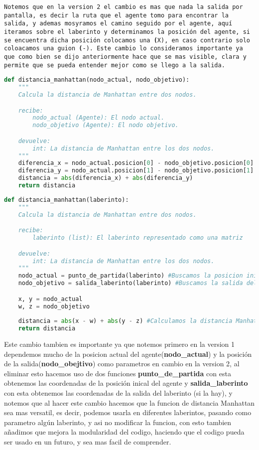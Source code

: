 {\tt Notemos que en la version 2 el cambio es mas que nada la salida por pantalla, es decir la ruta que el agente tomo para encontrar la salida, y ademas mosyramos el camino seguido por el agente, aquí iteramos sobre el laberinto y determinamos la posición del agente, si se encuentra dicha posición colocamos una \textbf(X), en caso contrario solo coloacamos una guion \textbf(-). Este cambio lo consideramos importante ya que como bien se dijo anteriormente hace que se mas visible, clara y permite que se pueda entender mejor como se llego a la salida.}

\begin{lstlisting}[language=Python, caption=Version 1: distancia_manhattan]
    def distancia_manhattan(nodo_actual, nodo_objetivo):
    """
    Calcula la distancia de Manhattan entre dos nodos.

    recibe:
        nodo_actual (Agente): El nodo actual.
        nodo_objetivo (Agente): El nodo objetivo.

    devuelve:
        int: La distancia de Manhattan entre los dos nodos.
    """
    diferencia_x = nodo_actual.posicion[0] - nodo_objetivo.posicion[0]
    diferencia_y = nodo_actual.posicion[1] - nodo_objetivo.posicion[1]
    distancia = abs(diferencia_x) + abs(diferencia_y)
    return distancia
\end{lstlisting}

\begin{lstlisting}[language=Python, caption=Version 2: distancia_manhattan]
    def distancia_manhattan(laberinto):
    """
    Calcula la distancia de Manhattan entre dos nodos.

    recibe:
        laberinto (list): El laberinto representado como una matriz

    devuelve:
        int: La distancia de Manhattan entre los dos nodos.
    """
    nodo_actual = punto_de_partida(laberinto) #Buscamos la posicion inicial del agente
    nodo_objetivo = salida_laberinto(laberinto) #Buscamos la salida del laberinto

    x, y = nodo_actual 
    w, z = nodo_objetivo
    
    distancia = abs(x - w) + abs(y - z) #Calculamos la distancia Manhattan dados dos puntos
    return distancia
\end{lstlisting}

Este cambio tambien es importante ya que notemos primero en la version 1 dependemos mucho de la posicion actual del agente(\textbf{nodo_actual}) y la posición de la salida(\textbf{nodo_obejtivo}) como parametros en cambio en la version 2, al eliminar esto hacemos uso de dos funciones \textbf{punto_de_partida} con esta obtenemos las coordenadas de la posición inical del agente y \textbf{salida_laberinto} con esta obtenemos las coordenadas de la salida del laberinto (si la hay), y notemos que al hacer este cambio hacemos que la funcion de distancia Manhattan sea mas versatil, es decir, podemos usarla en diferentes laberintos, pasando como parametro algún laberinto, y asi no modificar la funcion, con esto tambien añadimos que mejora la modularidad del codigo, haciendo que el codigo pueda ser usado en un futuro, y sea mas facil de comprender.

